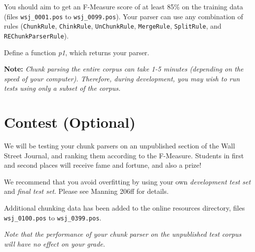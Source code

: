 \documentclass{cis530}
\begin{document}
  You should aim to get an F-Measure score of at least
  85\% on the training data (files 
  \texttt{wsj\_0001.pos} to \texttt{wsj\_0099.pos}).
  Your parser can use any
  combination of rules (\texttt{ChunkRule}, \texttt{ChinkRule},
  \texttt{UnChunkRule}, \texttt{MergeRule}, \texttt{SplitRule}, and
  \texttt{REChunkParserRule}).

  Define a function \textit{p1}, which returns your parser.

  \textbf{Note:} \textit{Chunk parsing the entire corpus can take 1-5
  minutes (depending on the speed of your computer).  Therefore,
  during development, you may wish to run tests using only a subset of
  the corpus.}

\section{Contest (Optional)}

  We will be testing your chunk parsers on an unpublished section of
  the Wall Street Journal, and ranking them according to the
  F-Measure.  Students in first and second places will receive fame
  and fortune, and also a prize!

  We recommend that you avoid overfitting by using your own
  \emph{development test set} and \emph{final test set}.
  Please see Manning 206ff for details.

  Additional chunking data has been added to the online resources
  directory, files \texttt{wsj\_0100.pos} to \texttt{wsj\_0399.pos}.

  \emph{Note that the performance of your chunk parser on the unpublished
  test corpus will have no effect on your grade.}
\end{document}
